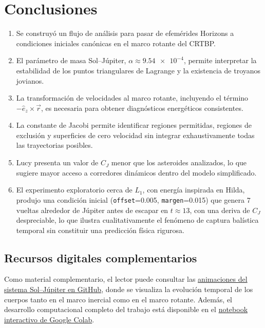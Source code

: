 \documentclass[12pt,a4paper]{article}
\begin{document}
\section{Conclusiones}
\begin{enumerate}
  \item Se construyó un flujo de análisis para pasar de efemérides Horizons a condiciones iniciales canónicas en el marco rotante del CRTBP.
  \item El parámetro de masa Sol--Júpiter, \(\alpha\approx\num{9.54e-4}\), permite interpretar la estabilidad de los puntos triangulares de Lagrange y la existencia de troyanos jovianos.
  \item La transformación de velocidades al marco rotante, incluyendo el término \(-\hat e_z\times\vec r\), es necesaria para obtener diagnósticos energéticos consistentes.
  \item La constante de Jacobi permite identificar regiones permitidas, regiones de exclusión y superficies de cero velocidad sin integrar exhaustivamente todas las trayectorias posibles.
  \item Lucy presenta un valor de \(C_J\) menor que los asteroides analizados, lo que sugiere mayor acceso a corredores dinámicos dentro del modelo simplificado.
  \item El experimento exploratorio cerca de \(L_1\), con energía inspirada en Hilda, produjo una condición inicial (\texttt{offset}=0.005, \texttt{margen}=0.015) que genera 7 vueltas alrededor de Júpiter antes de escapar en \(t\approx13\), con una deriva de \(C_J\) despreciable, lo que ilustra cualitativamente el fenómeno de captura balística temporal sin constituir una predicción física rigurosa.
\end{enumerate}

\subsection*{Recursos digitales complementarios}
\noindent
Como material complementario, el lector puede consultar las \href{https://github.com/Daniel-534/MecanicaCeleste/tree/main/Modelacion3}{animaciones del sistema Sol--Júpiter en GitHub}, donde se visualiza la evolución temporal de los cuerpos tanto en el marco inercial como en el marco rotante. Además, el desarrollo computacional completo del trabajo está disponible en el \href{https://colab.research.google.com/github/Daniel-534/MecanicaCeleste/blob/main/Modelacion3/CRTBP_Jupiter.ipynb}{notebook interactivo de Google Colab}.

\clearpage
{}
{}
\nocite{zuluaga_mecanica_celeste,jpl_horizons,giorgini1996horizons,nasa_lucy,murray1999solar,szebehely1967}


\end{document}
